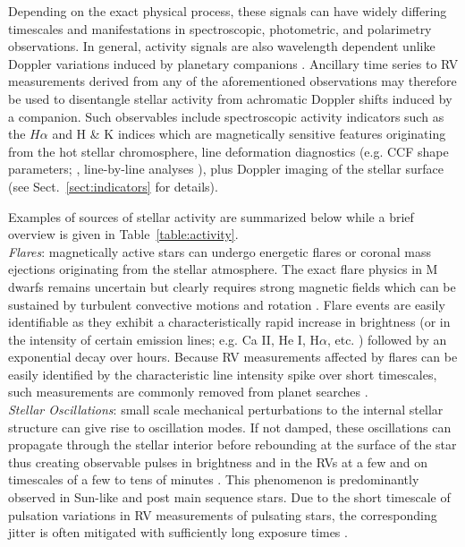 Depending on the exact physical process, these
signals can have widely differing timescales and manifestations in
spectroscopic, photometric, and polarimetry observations. In general, activity
signals are also wavelength dependent unlike Doppler variations induced by
planetary companions \citep{tal-or18}. Ancillary time series to RV measurements
derived from any of the aforementioned observations may therefore be used to
disentangle stellar activity from achromatic Doppler shifts induced by a companion.
Such observables include spectroscopic activity indicators such as the $H\alpha$ and
\caii{} H \& K indices which are magnetically sensitive features originating from the hot stellar
chromosphere, line deformation diagnostics (e.g. CCF shape parameters; \citealt{boisse11},
line-by-line analyses \citealt{davis17,dumusque18}), plus Doppler imaging of the stellar surface
\citep{hebrard16} (see Sect.~\ref{sect:indicators} for details). 

Examples of sources of stellar activity are summarized below
while a brief overview is given in Table~\ref{table:activity}. \\



\emph{Flares}: magnetically active stars can undergo energetic flares or coronal mass
ejections originating from the stellar atmosphere. The exact flare physics
in M dwarfs remains uncertain but clearly requires strong magnetic fields
which can be sustained by turbulent convective motions and rotation
\citep{browning08}. Flare events are easily identifiable as they
exhibit a characteristically rapid increase in brightness (or in the intensity
of certain emission lines; e.g. Ca II, He I, H$\alpha$, etc. \citealt{schmidt12})
followed by an exponential decay over hours. Because RV
measurements affected by flares can be easily identified by the characteristic
line intensity spike over short timescales, such measurements are commonly
removed from planet searches \citep{reiners09}. \\

\emph{Stellar Oscillations}:
small scale mechanical perturbations to the internal stellar structure
can give rise to oscillation modes. If not damped, these oscillations
can propagate through the stellar interior before rebounding at the surface
of the star thus creating observable pulses in brightness and in the RVs at a
few \mps{} and on timescales of a few to tens of minutes \citep{bedding01}. 
This phenomenon is predominantly observed in Sun-like and post main sequence stars.
Due to the short timescale of
pulsation variations in RV measurements of pulsating stars, the corresponding
jitter is often mitigated with sufficiently long exposure times
\citep{lovis05, dumusque11a}. \\


